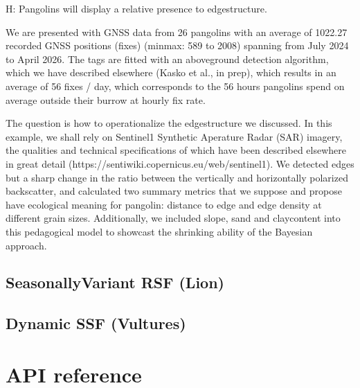 \documentclass[letterpaper,10pt,english]{sphinxmanual}
\begin{document}
\sphinxAtStartPar
H: Pangolins will display a relative presence to edge\sphinxhyphen{}structure.

\sphinxAtStartPar
We are presented with GNSS data from 26 pangolins with an average of 1022.27 recorded GNSS positions (fixes) (min\sphinxhyphen{}max: 589 to 2008) spanning from July 2024 to April 2026. The tags are fitted with an above\sphinxhyphen{}ground detection algorithm, which we have described elsewhere (Kasko et al., in prep), which results in an average of 5\sphinxhyphen{}6 fixes / day, which corresponds to the 5\sphinxhyphen{}6 hours pangolins spend on average outside their burrow at hourly fix rate.

\sphinxAtStartPar
The question is how to operationalize the edge\sphinxhyphen{}structure we discussed. In this example, we shall rely on Sentinel\sphinxhyphen{}1 Synthetic Aperature Radar (SAR) imagery, the qualities and technical specifications of which have been described elsewhere in great detail (https://sentiwiki.copernicus.eu/web/sentinel\sphinxhyphen{}1). We detected edges but a sharp change in the ratio between the vertically and horizontally polarized backscatter, and calculated two summary metrics that we suppose and propose have ecological meaning for pangolin: distance to edge and edge density at different grain sizes. Additionally, we included slope, sand\sphinxhyphen{} and clay\sphinxhyphen{}content into this pedagogical model to showcast the shrinking ability of the Bayesian approach.


\section{Seasonally\sphinxhyphen{}Variant RSF (Lion)}
\label{\detokenize{case-studies:seasonally-variant-rsf-lion}}

\section{Dynamic SSF (Vultures)}
\label{\detokenize{case-studies:dynamic-ssf-vultures}}
\sphinxstepscope


\chapter{API reference}
\label{\detokenize{api:api-reference}}\label{\detokenize{api::doc}}


\renewcommand{\indexname}{Index}
\printindex
\end{document}
